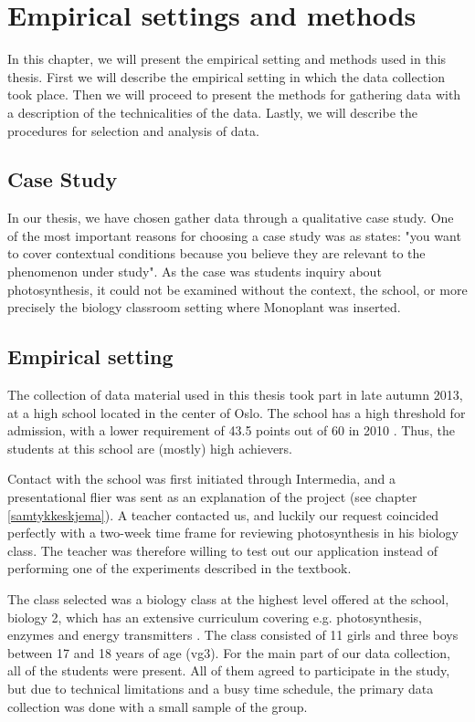 \chapter{Empirical settings and methods}
In this chapter, we will present the empirical setting and methods used in this thesis. First we will describe the empirical setting in which the data collection took place. Then we will proceed to present the methods for gathering data with a description of the technicalities of the data. Lastly, we will describe the procedures for selection and analysis of data.

\section{Case Study}
In our thesis, we have chosen gather data through a qualitative case study.  One of the most important reasons for choosing a case study was as \citet{yin2003case} states: "you want to cover contextual conditions because you believe they are relevant to the phenomenon under study". As the case was students inquiry about photosynthesis, it could not be examined without the context, the school, or more precisely the biology classroom setting where Monoplant was inserted. 



\section{Empirical setting}
The collection of data material used in this thesis took part in late autumn 2013, at a high school located in the center of Oslo. The school has a high threshold for admission, with a lower requirement of 43.5 points out of 60 in 2010 \citep{utdanningsetaten}. Thus, the students at this school are (mostly) high achievers. 

Contact with the school was first initiated through Intermedia, and a presentational flier was sent as an explanation of the project (see chapter \ref{samtykkeskjema}). A teacher contacted us, and luckily our request coincided perfectly with a two-week time frame for reviewing photosynthesis in his biology class. The teacher was therefore willing to test out our application instead of performing one of the experiments described in the textbook. 

The class selected was a biology class at the highest level offered at the school, biology 2, which has an extensive curriculum covering e.g. photosynthesis, enzymes and energy transmitters \citep{bios}. The class consisted of 11 girls and three boys between 17 and 18 years of age (vg3). For the main part of our data collection, all of the students were present. All of them agreed to participate in the study, but due to technical limitations and a busy time schedule, the primary data collection was  done with a small sample of the group. 


